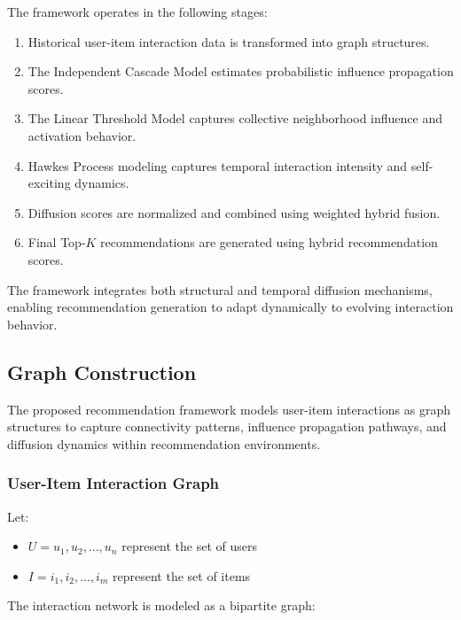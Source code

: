 \documentclass{article}
\begin{document}
The framework operates in the following stages:

\begin{enumerate}
\item Historical user-item interaction data is transformed into graph structures.

\item The Independent Cascade Model estimates probabilistic influence propagation scores.

\item The Linear Threshold Model captures collective neighborhood influence and activation behavior.

\item Hawkes Process modeling captures temporal interaction intensity and self-exciting dynamics.

\item Diffusion scores are normalized and combined using weighted hybrid fusion.

\item Final Top-\(K\) recommendations are generated using hybrid recommendation scores.
\end{enumerate}

The framework integrates both structural and temporal diffusion mechanisms, enabling recommendation generation to adapt dynamically to evolving interaction behavior.

\subsection{Graph Construction}

The proposed recommendation framework models user-item interactions as graph structures to capture connectivity patterns, influence propagation pathways, and diffusion dynamics within recommendation environments.

\subsubsection{User-Item Interaction Graph}

Let:
\begin{itemize}
\item $U = {u_1, u_2, ..., u_n}$ represent the set of users
\item $I = {i_1, i_2, ..., i_m}$ represent the set of items
\end{itemize}

The interaction network is modeled as a bipartite graph:
\end{document}
